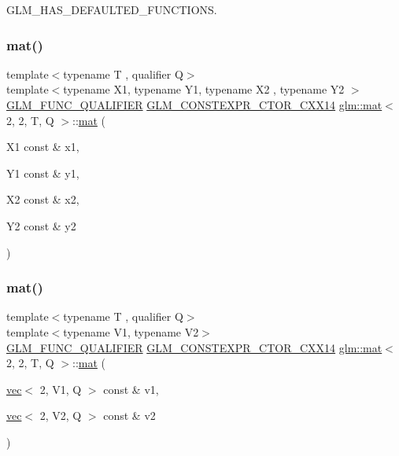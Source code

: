 G\+L\+M\+\_\+\+H\+A\+S\+\_\+\+D\+E\+F\+A\+U\+L\+T\+E\+D\+\_\+\+F\+U\+N\+C\+T\+I\+O\+NS. 

\mbox{\label{structglm_1_1mat_3_012_00_012_00_01_t_00_01_q_01_4_a2648b2f4eae0dbdc87ebc1438ef45719}} 
\subsubsection{\texorpdfstring{mat()}{mat()}\hspace{0.1cm}{\footnotesize\ttfamily [19/21]}}
{\footnotesize\ttfamily template$<$typename T , qualifier Q$>$ \\
template$<$typename X1, typename Y1, typename X2 , typename Y2 $>$ \\
\hyperlink{setup_8hpp_a33fdea6f91c5f834105f7415e2a64407}{G\+L\+M\+\_\+\+F\+U\+N\+C\+\_\+\+Q\+U\+A\+L\+I\+F\+I\+ER} \hyperlink{setup_8hpp_a0900f9145e68bf6061b6f5e7be3fa751}{G\+L\+M\+\_\+\+C\+O\+N\+S\+T\+E\+X\+P\+R\+\_\+\+C\+T\+O\+R\+\_\+\+C\+X\+X14} \hyperlink{structglm_1_1mat}{glm\+::mat}$<$ 2, 2, T, Q $>$\+::\hyperlink{structglm_1_1mat}{mat} (\begin{DoxyParamCaption}\item[{X1 const \&}]{x1,  }\item[{Y1 const \&}]{y1,  }\item[{X2 const \&}]{x2,  }\item[{Y2 const \&}]{y2 }\end{DoxyParamCaption})}

\mbox{\label{structglm_1_1mat_3_012_00_012_00_01_t_00_01_q_01_4_a57de0b97d240ad056c3aa54425eb8244}} 
\subsubsection{\texorpdfstring{mat()}{mat()}\hspace{0.1cm}{\footnotesize\ttfamily [20/21]}}
{\footnotesize\ttfamily template$<$typename T , qualifier Q$>$ \\
template$<$typename V1, typename V2$>$ \\
\hyperlink{setup_8hpp_a33fdea6f91c5f834105f7415e2a64407}{G\+L\+M\+\_\+\+F\+U\+N\+C\+\_\+\+Q\+U\+A\+L\+I\+F\+I\+ER} \hyperlink{setup_8hpp_a0900f9145e68bf6061b6f5e7be3fa751}{G\+L\+M\+\_\+\+C\+O\+N\+S\+T\+E\+X\+P\+R\+\_\+\+C\+T\+O\+R\+\_\+\+C\+X\+X14} \hyperlink{structglm_1_1mat}{glm\+::mat}$<$ 2, 2, T, Q $>$\+::\hyperlink{structglm_1_1mat}{mat} (\begin{DoxyParamCaption}\item[{\hyperlink{structglm_1_1vec}{vec}$<$ 2, V1, Q $>$ const \&}]{v1,  }\item[{\hyperlink{structglm_1_1vec}{vec}$<$ 2, V2, Q $>$ const \&}]{v2 }\end{DoxyParamCaption})}

